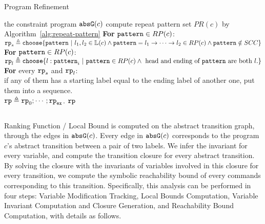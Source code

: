 \begin{algorithm}
\caption{
{Program Refinement}
\label{alg:prog_refine}
}
\begin{algorithmic}[1]
\REQUIRE the constraint program $\mathtt{abs}{\mathtt{G}}(c)$
\STATE  compute repeat pattern set $PR(c)$ by Algorithm~\ref{alg:repeat-pattern}
\STATE  \textbf{For} $\mathtt{pattern} \in RP(c)$:
\\ \quad 
$\rprog_{s} \triangleq 
  \rpchoose{
  \rpattern ~|~ l_1, l_2 \in \lvar(c) \land 
  \rpattern = l_1 \to \cdots \to l_2 \in RP(c) 
  \land  \rpattern \notin SCC
    }
$
\STATE \textbf{For} $\mathtt{pattern} \in RP(c)$:
\\ \quad
$\rprog_l \triangleq 
\rpchoose{
 l: \rpattern_{i} ~|~ \rpattern \in RP(c) \land \text{ head and ending of } \rpattern \text{ are both } l.
}$
\STATE \textbf{For} every $\mathtt{rp}_{s}$ and $\mathtt{rp}_l$:
\\ \quad
      if any of them has a starting label equal to the ending label of another one,
put them into a sequence.
\\ 
$\mathtt{rp} \triangleq \mathtt{rp}_0; \cdots; \mathtt{rp}_{\mathtt{ex}}$.
\RETURN $\mathtt{rp}$
\end{algorithmic}
\end{algorithm}
%
%
\subsection{}
\label{sec:pathsensitive_rb-lbcompute}
Ranking Function / Local Bound is computed on the abstract transition graph, 
through the edges in $\mathtt{abs}{\mathtt{G}}(c)$.
Every edge in $\mathtt{abs}{\mathtt{G}}(c)$ corresponds to the program $c$'s abstract transition between a pair of two labels.
We infer the invariant for every variable, and compute the transition closure for every abstract transition. By solving the closure
with the invariants of variables involved in this closure for every transition, we compute
the symbolic reachability bound of every commands corresponding to this transition. Specifically, this analysis can be performed in four steps:
 Variable Modification Tracking, Local Bounds Computation,
Variable Invariant Computation and Closure Generation, and Reachability Bound Computation,
% 
with details as follows.
%
%

